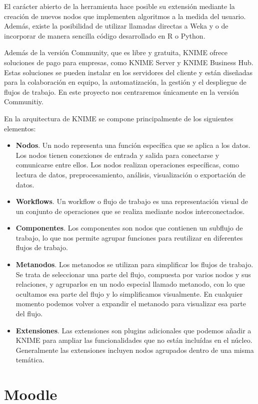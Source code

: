 El carácter abierto de la herramienta hace posible su extensión mediante la creación de nuevos nodos que 
implementen algoritmos a la medida del usuario. Además, existe la posibilidad de utilizar llamadas directas a Weka y 
o de incorporar de manera sencilla código desarrollado en R o Python.
\

Además de la versión Community, que es libre y gratuita, KNIME ofrece soluciones de pago para empresas, como KNIME Server 
y KNIME Business Hub. Estas soluciones se pueden instalar en los servidores del cliente y están diseñadas para la 
colaboración en equipo, la automatización, la gestión y el despliegue de flujos de trabajo. En este proyecto nos centraremos únicamente
en la versión Communitiy. 
\

En la arquitectura de KNIME se compone principalmente de los siguientes elementos: 

\begin{itemize}
	\item \textbf{Nodos}. Un nodo representa una función específica que se aplica a los datos. Los nodos tienen conexiones de
	 entrada y salida para conectarse y comunicarse entre ellos. Los nodos realizan operaciones específicas, 
	 como lectura de datos, preprocesamiento, análisis, visualización o exportación de datos. 
	\item \textbf{Workflows}. Un workflow o flujo de trabajo es una representación visual de un conjunto de operaciones que se realiza 
	mediante nodos interconectados. 
	\item \textbf{Componentes}. Los componentes son nodos que contienen un subflujo de trabajo, lo que nos permite agrupar 
	funciones para reutilizar en diferentes flujos de trabajo. 	
	\item \textbf{Metanodos}. Los metanodos se utilizan para simplificar los flujos de trabajo. Se trata de seleccionar una parte del flujo, 
	compuesta por varios nodos y sus relaciones, y agruparlos en un nodo especial llamado metanodo, con lo que ocultamos esa parte del flujo 
	y lo simplificamos visualmente. En cualquier momento podemos volver a expandir el metanodo para visualizar esa parte del flujo. 
	\item \textbf{Extensiones}. Las extensiones son plugins adicionales que podemos añadir a KNIME para ampliar las funcionalidades que 
	no están incluídas en el núcleo. Generalmente las extensiones incluyen nodos agrupados dentro de una misma temática. 
\end{itemize}

\section{Moodle}

